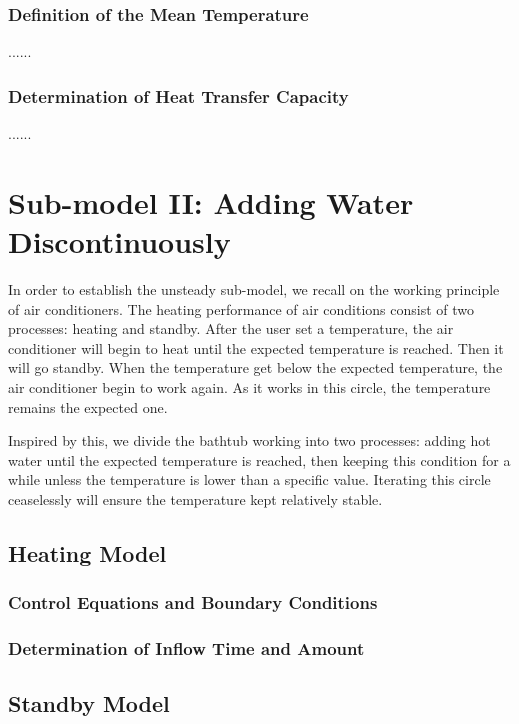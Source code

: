 \documentclass{mcmthesis}
\begin{document}
\subsubsection{Definition of the Mean Temperature}

......

\subsubsection{Determination of Heat Transfer Capacity}

......

\section{Sub-model II: Adding Water Discontinuously}

In order to establish the unsteady sub-model, we recall on the working principle 
of air conditioners. The heating performance of air conditions consist of two 
processes: heating and standby. After the user set a temperature, the air 
conditioner will begin to heat until the expected temperature is reached. Then 
it will go standby. When the temperature get below the expected temperature, 
the air conditioner begin to work again. As it works in this circle, the 
temperature remains the expected one.

Inspired by this, we divide the bathtub working into two processes: adding
hot water until the expected temperature is reached, then keeping this
condition for a while unless the temperature is lower than a specific value. 
Iterating this circle ceaselessly will ensure the temperature kept relatively 
stable.

\subsection{Heating Model}

\subsubsection{Control Equations and Boundary Conditions}

\subsubsection{Determination of Inflow Time and Amount}

\subsection{Standby Model}
\end{document}
